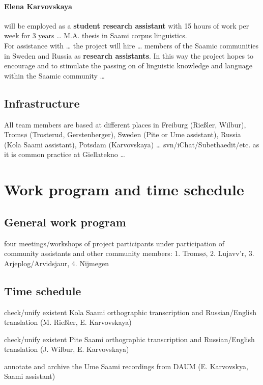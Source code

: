 \documentclass[a4paper,12pt]{article}
\begin{document}
\paragraph{Elena Karvovskaya} will be employed as a \textbf{student research assistant} with 15 hours of work per week for 3 years … M.A. thesis in Saami corpus linguistics.\\

For assistance with … the project will hire … members of the Saamic communities in Sweden and Russia as \textbf{research assistants}. In this way the project hopes to encourage and to stimulate the passing on of linguistic knowledge and language within the Saamic community …

\subsection{Infrastructure}
All team members are based at different places in Freiburg (Rießler, Wilbur), Tromsø (Trosterud, Gerstenberger), Sweden (Pite or Ume assistant), Russia (Kola Saami assistant), Potsdam (Karvovskaya) … svn/iChat/Subethaedit/etc. as it is common practice at Giellatekno …

\section{Work program and time schedule}
\subsection{General work program}

four meetings/workshops of project participants under participation of community assistants and other community members: 1. Tromsø, 2. Lujavv'r, 3. Arjeplog/Arvidsjaur, 4. Nijmegen %

\subsection{Time schedule}

check/unify existent Kola Saami orthographic transcription and Russian/English translation (M. Rießler, E. Karvovskaya)

check/unify existent Pite Saami orthographic transcription and Russian/English translation (J. Wilbur, E. Karvovskaya)

annotate and archive the Ume Saami recordings from DAUM (E. Karvovskya, Saami assistant)
\end{document}
